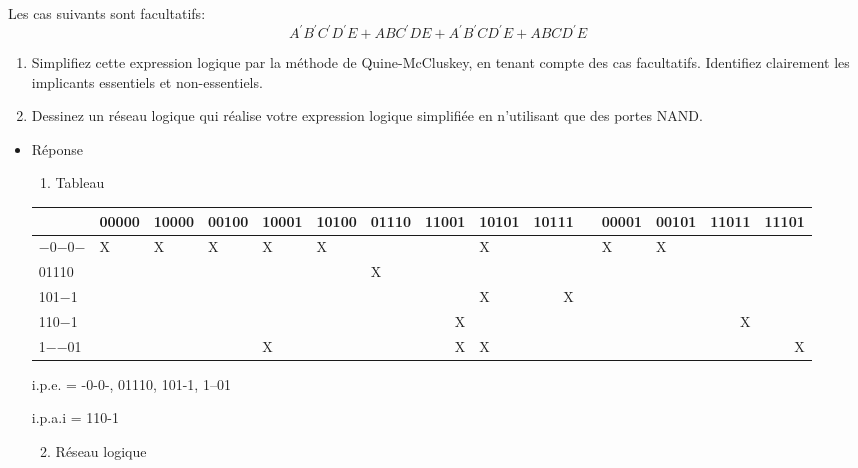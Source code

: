 \documentclass[letter, oneside]{book}
\begin{document}
\begin{itemize}
Les cas suivants sont facultatifs:
$$
A^{\prime} B^{\prime} C^{\prime} D^{\prime} {E} + {A} {B} C^{\prime} {D} {E} + 
 A^{\prime}B^{\prime} {C} D^{\prime} {E} + {A} {B} {C} D^{\prime} {E}
$$

\begin{enumerate}
\item Simplifiez cette expression logique par la méthode de
Quine-McCluskey, en tenant compte des cas facultatifs. Identifiez
clairement les implicants essentiels et non-essentiels.

\item Dessinez un réseau logique qui réalise votre expression logique
simplifiée en n'utilisant que des portes NAND.
\end{enumerate}

\begin{itemize}
\item Réponse
\label{sec:orgcc3a516}
\begin{enumerate}
\item Tableau
\end{enumerate}
\tiny{ %
\begin{center}
\begin{tabular}{lllllllrlrlllrr}
 & 00000 & 10000 & 00100 & 10001 & 10100 & 01110 & 11001 & 10101 & 10111 &  & 00001 & 00101 & 11011 & 11101\\[0pt]
\hline
−0−0− & X & X & X & X & X &  &  & X &  &  & X & X &  & \\[0pt]
01110 &  &  &  &  &  & X &  &  &  &  &  &  &  & \\[0pt]
101−1 &  &  &  &  &  &  &  & X & X &  &  &  &  & \\[0pt]
110−1 &  &  &  &  &  &  & X &  &  &  &  &  & X & \\[0pt]
1−−01 &  &  &  & X &  &  & X & X &  &  &  &  &  & X\\[0pt]
\end{tabular}
\end{center}
}

i.p.e. = -0-0-, 01110, 101-1, 1--01

i.p.a.i = 110-1

\begin{enumerate}
\setcounter{enumi}{1}
\item Réseau logique
\begin{center}

\end{center}
\end{enumerate}
\end{itemize}


\end{itemize}
\end{document}
